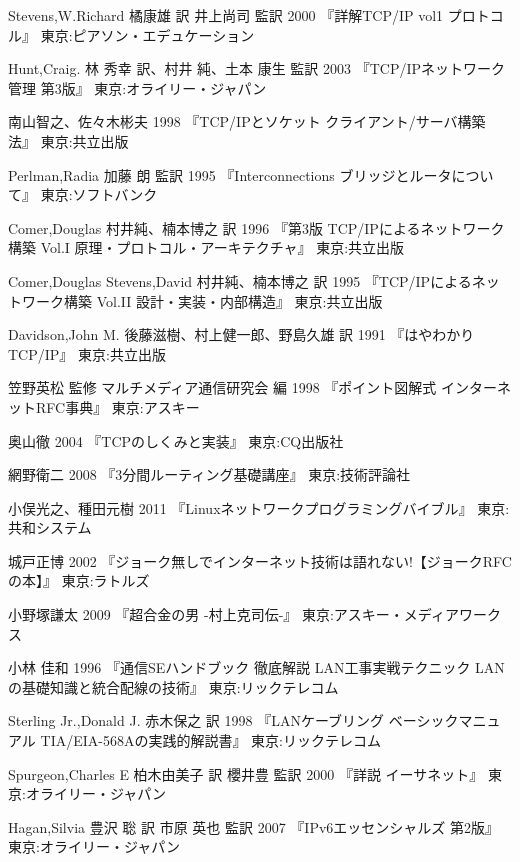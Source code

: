 \begin{thebibliography}{99}
\item
	Stevens,W.Richard
	橘康雄 訳 井上尚司 監訳
	2000
	『詳解TCP/IP vol1 プロトコル』
	東京:ピアソン・エデュケーション
\item
    Hunt,Craig.
	林 秀幸 訳、村井 純、土本 康生 監訳
	2003
	『TCP/IPネットワーク管理 第3版』
	東京:オライリー・ジャパン
\item	
	南山智之、佐々木彬夫
	1998
	『TCP/IPとソケット クライアント/サーバ構築法』
	東京:共立出版
\item
	Perlman,Radia
	加藤 朗 監訳
	1995
	『Interconnections ブリッジとルータについて』
	東京:ソフトバンク
\item
	Comer,Douglas
	村井純、楠本博之 訳
	1996
	『第3版 TCP/IPによるネットワーク構築 Vol.I 原理・プロトコル・アーキテクチャ』
	東京:共立出版
\item
	Comer,Douglas Stevens,David
	村井純、楠本博之 訳
	1995
	『TCP/IPによるネットワーク構築 Vol.II 設計・実装・内部構造』
	東京:共立出版
\item
	Davidson,John M.
	後藤滋樹、村上健一郎、野島久雄 訳
	1991
	『はやわかりTCP/IP』
	東京:共立出版
\item
	笠野英松 監修
	マルチメディア通信研究会 編
	1998
	『ポイント図解式 インターネットRFC事典』
	東京:アスキー
\item
	奥山徹
	2004
	『TCPのしくみと実装』
	東京:CQ出版社
\item
	網野衛二
	2008
	『3分間ルーティング基礎講座』
	東京:技術評論社
\item
	小俣光之、種田元樹
	2011
	『Linuxネットワークプログラミングバイブル』
	東京:共和システム
\item
	城戸正博
	2002
	『ジョーク無しでインターネット技術は語れない!【ジョークRFCの本】』
	東京:ラトルズ
\item	
	小野塚謙太
	2009
	『超合金の男 -村上克司伝-』
	東京:アスキー・メディアワークス
\item
	小林 佳和
	1996
	『通信SEハンドブック 徹底解説 LAN工事実戦テクニック LANの基礎知識と統合配線の技術』
	東京:リックテレコム
\item
     Sterling Jr.,Donald J.
	赤木保之 訳
	1998
	『LANケーブリング ベーシックマニュアル TIA/EIA-568Aの実践的解説書』
	東京:リックテレコム
\item
     Spurgeon,Charles E
	柏木由美子 訳
	櫻井豊 監訳
	2000
	『詳説 イーサネット』
	東京:オライリー・ジャパン
\item
	Hagan,Silvia
	豊沢 聡 訳
	市原 英也 監訳
	2007
	『IPv6エッセンシャルズ 第2版』
	東京:オライリー・ジャパン

\end{thebibliography}

